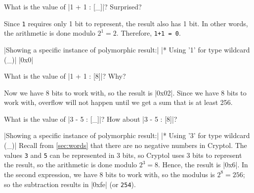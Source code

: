 \restartrepl
\begin{Exercise}\label{ex:arith:1}
What is the value of \replin|1 + 1 : [_]|? Surprised?
\end{Exercise}
\begin{Answer}
  Since {\tt 1} requires only 1 bit to represent, the result also has
  1 bit. In other words, the arithmetic is done modulo $2^1 =
  2$. Therefore, {\tt 1+1 = 0}.
\end{Answer}
\hidereplout|Showing a specific instance of polymorphic result:|
\hidereplout|* Using '1' for type wildcard (_)|
\hidereplout|0x0|

\restartrepl
\begin{Exercise}\label{ex:arith:2}
What is the value of \replin|1 + 1 : [8]|? Why?
\end{Exercise}
\begin{Answer}
  Now we have 8 bits to work with, so the result is \replout|0x02|. Since we
  have 8 bits to work with, overflow will not happen until we get a
  sum that is at least 256.
\end{Answer}

\restartrepl
\begin{Exercise}\label{ex:arith:3}
What is the value of \replin|3 - 5 : [_]|? How about \replin|3 - 5 : [8]|?
\end{Exercise}
\begin{Answer}
  \hidereplout|Showing a specific instance of polymorphic result:|
  \hidereplout|* Using '3' for type wildcard (_)|
  Recall from \autoref{sec:words} that there are no negative
  numbers in Cryptol. The values \texttt{3} and \texttt{5} can be
  represented in 3 bits, so Cryptol uses 3 bits to represent the
  result, so the arithmetic is done modulo $2^3=8$. Hence, the result
  is \replout|0x6|.  In the second expression, we have 8 bits to work with,
  so the modulus is $2^8 = 256$; so the subtraction results in
  \replout|0xfe| (or \Verb|254|).
\end{Answer}

\indModular\indMinus

